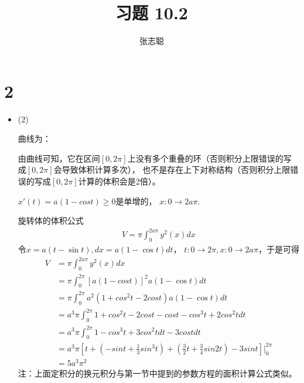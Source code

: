 \documentclass{article}
\begin{document}
\title{习题 10.2}
\author{张志聪}
\maketitle

\section*{2}

\begin{itemize}
  \item (2)

        曲线为：

        由曲线可知，它在区间$[0, 2\pi]$上没有多个重叠的环（否则积分上限错误的写成$[0, 2\pi]$会导致体积计算多次），
        也不是存在上下对称结构（否则积分上限错误的写成$[0, 2\pi]$计算的体积会是2倍）。

        $x'(t) = a(1 - cost) \geq 0$是单增的，
        $x : 0 \to 2a \pi$.

        旋转体的体积公式
        \begin{align*}
          V = \pi \int_{0}^{2a\pi} y^2(x) dx
        \end{align*}
        令$x = a(t - \sin t), dx = a(1 - \cos t)dt$，
        $t: 0 \to 2\pi, x : 0 \to 2a \pi$，于是可得
        \begin{align*}
          V & = \pi \int_{0}^{2a\pi} y^2(x) dx                                                                            \\
            & = \pi \int_{0}^{2\pi} [a(1 - cost)]^2 a(1 - \cos t) dt                                                      \\
            & = \pi \int_{0}^{2\pi} a^2(1 + cos^2t - 2cost) a(1 - \cos t) dt                                              \\
            & = a^3\pi \int_{0}^{2\pi} 1 + cos^2t - 2cost - cost - cos^3t + 2cos^2t dt                                    \\
            & = a^3\pi \int_{0}^{2\pi} 1 - cos^3t + 3cos^2t dt - 3cost dt                                                 \\
            & = a^3\pi [t + (- sint + \frac{1}{3}sin^3 t) + (\frac{3}{2} t + \frac{3}{4}sin2t) - 3 sint]\bigg|_{0}^{2\pi} \\
            & = 5a^3 \pi^2
        \end{align*}
        注：上面定积分的换元积分与第一节中提到的参数方程的面积计算公式类似。


\end{itemize}
\end{document}
